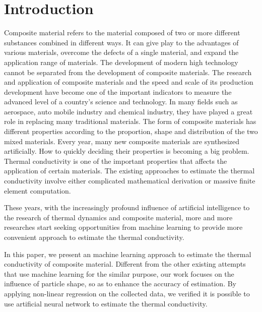 \documentclass[conference,compsoc]{IEEEtran}
\begin{document}
%
\IEEEpeerreviewmaketitle



\section{Introduction}

Composite material refers to the material composed of two or more different substances combined in different ways. It can give play to the advantages of various materials, overcome the defects of a single material, and expand the application range of materials. The development of modern high technology cannot be separated from the development of composite materials. The research and application of composite materials and the speed and scale of its production development have become one of the important indicators to measure the advanced level of a country's science and technology. In many fields such as aerospace, auto mobile industry and chemical industry, they have played a great role in replacing many traditional materials. The form of composite materials has different properties according to the proportion, shape and distribution of the two mixed materials. Every year, many new composite materials are synthesized artificially. How to quickly deciding their properties is becoming a big problem. Thermal conductivity is one of the important properties that affects the application of certain materials. The existing approaches to estimate the thermal conductivity involve either complicated mathematical derivation or massive finite element computation. 

These years, with the increasingly profound influence of artificial intelligence to the research of thermal dynamics and composite material, more and more researches start seeking opportunities from machine learning to provide more convenient approach to estimate the thermal conductivity.

In this paper, we present an machine learning approach to estimate the thermal conductivity of composite material. Different from the other existing attempts that use machine learning for the similar purpose, our work focuses on the influence of particle shape, so as to enhance the accuracy of estimation. By applying non-linear regression on the collected data, we verified it is possible to use artificial neural network to estimate the thermal conductivity. 
\end{document}
